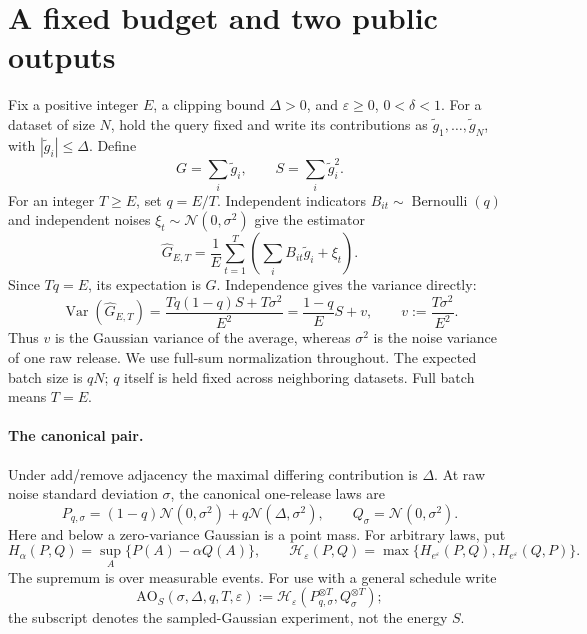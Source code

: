 \documentclass[11pt]{article}
\theoremstyle{remark}
\newcommand{\Normal}{\mathcal N}
\newcommand{\AO}{\mathrm{AO}}
\begin{document}
\section{A fixed budget and two public outputs}\label{sec:model}
Fix a positive integer $E$, a clipping bound $\Delta>0$, and
$\varepsilon\geq0$, $0<\delta<1$. For a dataset of size $N$, hold the query
fixed and write its contributions as $\widetilde g_1,\ldots,\widetilde g_N$,
with $|\widetilde g_i|\leq\Delta$. Define
\[
 G=\sum_i\widetilde g_i,\qquad S=\sum_i\widetilde g_i^2.
\]
For an integer $T\geq E$, set $q=E/T$. Independent indicators
$B_{it}\sim\operatorname{Bernoulli}(q)$ and independent noises
$\xi_t\sim\Normal(0,\sigma^2)$ give the estimator
\[
 \widehat G_{E,T}=\frac1E\sum_{t=1}^T
       \left(\sum_i B_{it}\widetilde g_i+\xi_t\right).
\]
Since $Tq=E$, its expectation is $G$. Independence gives the variance directly:
\begin{equation}\label{eq:variance}
 \operatorname{Var}(\widehat G_{E,T})
 =\frac{Tq(1-q)S+T\sigma^2}{E^2}
 =\frac{1-q}{E}S+v,\qquad v:=\frac{T\sigma^2}{E^2}.
\end{equation}
Thus $v$ is the Gaussian variance of the average, whereas $\sigma^2$ is the
noise variance of one raw release. We use full-sum normalization throughout.
The expected batch size is $qN$; $q$ itself is held fixed across neighboring
datasets. Full batch means $T=E$.

\paragraph{The canonical pair.}
Under add/remove adjacency the maximal differing contribution is $\Delta$.
At raw noise standard deviation $\sigma$, the canonical one-release laws are
\[
 P_{q,\sigma}=(1-q)\Normal(0,\sigma^2)+q\Normal(\Delta,\sigma^2),
 \qquad Q_\sigma=\Normal(0,\sigma^2).
\]
Here and below a zero-variance Gaussian is a point mass. For arbitrary laws,
put
\[
 H_\alpha(P,Q)=\sup_A\{P(A)-\alpha Q(A)\},\qquad
 \mathcal H_\varepsilon(P,Q)
 =\max\{H_{e^\varepsilon}(P,Q),H_{e^\varepsilon}(Q,P)\}.
\]
The supremum is over measurable events. For use with a general schedule write
\[
 \AO_S(\sigma,\Delta,q,T,\varepsilon)
 :=\mathcal H_\varepsilon(P_{q,\sigma}^{\otimes T},Q_\sigma^{\otimes T});
\]
the subscript denotes the sampled-Gaussian experiment, not the energy $S$.
\end{document}

